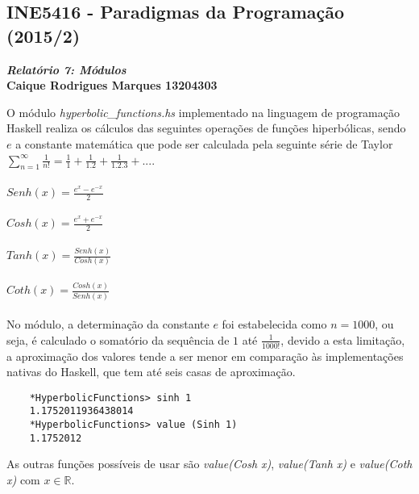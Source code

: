 \documentclass{article}
\begin{document}
    \begin{center}
        \section*{INE5416 - Paradigmas da Programação (2015/2)}
        \textbf{\textit{Relatório 7: Módulos} \\
        Caique Rodrigues Marques 13204303}
    \end{center}

O módulo \textit{hyperbolic\_functions.hs} implementado na linguagem de programação Haskell realiza os cálculos das seguintes operações de funções hiperbólicas, sendo $e$ a constante matemática que pode ser calculada pela seguinte série de Taylor $\sum_{n=1}^{\infty}\frac{1}{n!} = \frac{1}{1} + \frac{1}{1.2} + \frac{1}{1.2.3} +...$. \\ \\

\noindent
$Senh(x) = \frac{e^{x} - e^{-x}}{2}$ \\ \\
$Cosh(x) = \frac{e^{x} + e^{-x}}{2}$ \\ \\
$Tanh(x) = \frac{Senh(x)}{Cosh(x)}$ \\ \\
$Coth(x) = \frac{Cosh(x)}{Senh(x)}$ \\ \\
    
No módulo, a determinação da constante $e$ foi estabelecida como $n = 1000$, ou seja, é calculado o somatório da sequência de $1$ até $\frac{1}{1000!}$, devido a esta limitação, a aproximação dos valores tende a ser menor em comparação às implementações nativas do Haskell, que tem até seis casas de aproximação.

\begin{verbatim}
    *HyperbolicFunctions> sinh 1
    1.1752011936438014
    *HyperbolicFunctions> value (Sinh 1)
    1.1752012
\end{verbatim}

As outras funções possíveis de usar são \textit{value(Cosh x)}, \textit{value(Tanh x)} e \textit{value(Coth x)} com $x \in \mathbb{R}$.
\end{document}
